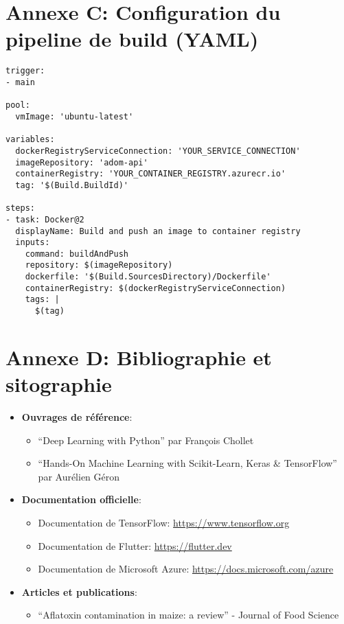 \documentclass[12pt,a4paper]{report}
\begin{document}
\section*{Annexe C: Configuration du pipeline de build (YAML)}
\begin{verbatim}
trigger:
- main

pool:
  vmImage: 'ubuntu-latest'

variables:
  dockerRegistryServiceConnection: 'YOUR_SERVICE_CONNECTION'
  imageRepository: 'adom-api'
  containerRegistry: 'YOUR_CONTAINER_REGISTRY.azurecr.io'
  tag: '$(Build.BuildId)'

steps:
- task: Docker@2
  displayName: Build and push an image to container registry
  inputs:
    command: buildAndPush
    repository: $(imageRepository)
    dockerfile: '$(Build.SourcesDirectory)/Dockerfile'
    containerRegistry: $(dockerRegistryServiceConnection)
    tags: |
      $(tag)
\end{verbatim}

\section*{Annexe D: Bibliographie et sitographie}
\begin{itemize}
    \item \textbf{Ouvrages de référence}:
        \begin{itemize}
            \item ``Deep Learning with Python'' par François Chollet
            \item ``Hands-On Machine Learning with Scikit-Learn, Keras \& TensorFlow'' par Aurélien Géron
        \end{itemize}
    \item \textbf{Documentation officielle}:
        \begin{itemize}
            \item Documentation de TensorFlow: \url{https://www.tensorflow.org}
            \item Documentation de Flutter: \url{https://flutter.dev}
            \item Documentation de Microsoft Azure: \url{https://docs.microsoft.com/azure}
        \end{itemize}
    \item \textbf{Articles et publications}:
        \begin{itemize}
            \item ``Aflatoxin contamination in maize: a review'' - Journal of Food Science
        \end{itemize}
\end{itemize}
\end{document}
